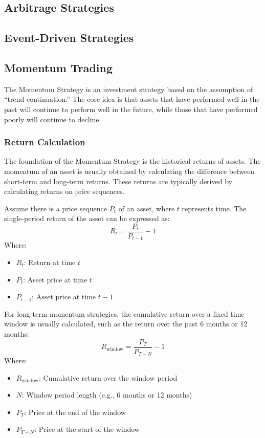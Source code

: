 \documentclass[12pt, oneside]{article}
\numberwithin{equation}{section}
\begin{document}
\subsection{Arbitrage Strategies}

\subsection{Event-Driven Strategies}

\subsection{Momentum Trading}


The Momentum Strategy is an investment strategy based on the assumption of ``trend continuation.'' The core idea is that assets that have performed well in the past will continue to perform well in the future, while those that have performed poorly will continue to decline.

\subsubsection{Return Calculation}

The foundation of the Momentum Strategy is the historical returns of assets. The momentum of an asset is usually obtained by calculating the difference between short-term and long-term returns. These returns are typically derived by calculating returns on price sequences.


Assume there is a price sequence \( P_t \) of an asset, where \( t \) represents time. The single-period return of the asset can be expressed as:
\[
R_t = \frac{P_t}{P_{t-1}} - 1
\]
Where:
\begin{itemize}
    \item \( R_t \): Return at time \( t \)
    \item \( P_t \): Asset price at time \( t \)
    \item \( P_{t-1} \): Asset price at time \( t-1 \)
\end{itemize}

For long-term momentum strategies, the cumulative return over a fixed time window is usually calculated, such as the return over the past 6 months or 12 months:
\[
R_{\text{window}} = \frac{P_T}{P_{T - N}} - 1
\]
Where:
\begin{itemize}
    \item \( R_{\text{window}} \): Cumulative return over the window period
    \item \( N \): Window period length (e.g., 6 months or 12 months)
    \item \( P_T \): Price at the end of the window
    \item \( P_{T-N} \): Price at the start of the window
\end{itemize}
\end{document}
